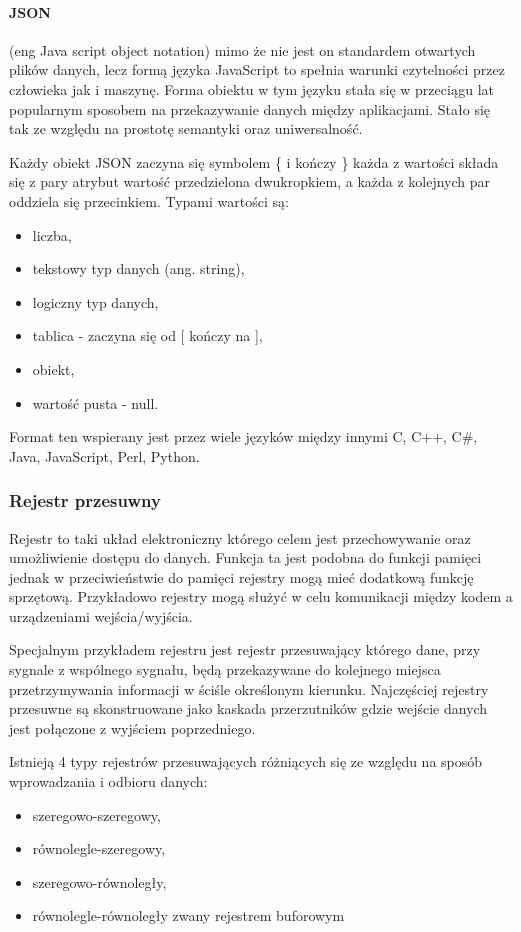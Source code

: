 \paragraph{JSON }
 
(eng Java script object notation) mimo że nie jest on standardem otwartych plików danych, lecz formą języka JavaScript to spełnia warunki czytelności przez człowieka jak i maszynę. 
Forma obiektu w tym języku stała się w przeciągu lat popularnym sposobem na przekazywanie danych między aplikacjami. Stało się tak ze względu na prostotę semantyki oraz uniwersalność. 

Każdy obiekt JSON zaczyna się symbolem \{ i kończy \} każda z wartości składa się z pary atrybut wartość przedzielona dwukropkiem, a każda z kolejnych par oddziela się przecinkiem. Typami wartości są:
\begin{itemize}
        \item liczba, 
        \item tekstowy typ danych (ang. string),
        \item logiczny typ danych,
        \item tablica - zaczyna się od [ kończy na ],
        \item obiekt,
        \item wartość pusta - null. 
\end{itemize}

Format ten wspierany jest przez wiele języków między innymi C, C++, C\#, Java, JavaScript, Perl, Python\cite{json}.

\subsubsection{Rejestr przesuwny}
Rejestr to taki układ elektroniczny którego celem jest przechowywanie oraz umożliwienie dostępu do danych. Funkcja ta jest podobna do funkcji pamięci jednak w przeciwieństwie do pamięci rejestry mogą mieć dodatkową funkcję sprzętową.
Przykładowo rejestry mogą służyć w celu komunikacji między kodem a urządzeniami wejścia/wyjścia.

Specjalnym przykładem rejestru jest rejestr przesuwający którego dane, przy sygnale z wspólnego sygnału, będą przekazywane do kolejnego miejsca przetrzymywania informacji w ściśle określonym kierunku.  
Najczęściej rejestry przesuwne są skonstruowane jako kaskada przerzutników gdzie wejście danych jest połączone z wyjściem poprzedniego.

Istnieją 4 typy rejestrów przesuwających różniących się ze względu na sposób wprowadzania i odbioru danych:
\begin{itemize}
        \item szeregowo-szeregowy,
        \item równolegle-szeregowy,
        \item szeregowo-równoległy,
        \item równolegle-równoległy zwany rejestrem buforowym  
\end{itemize} 
